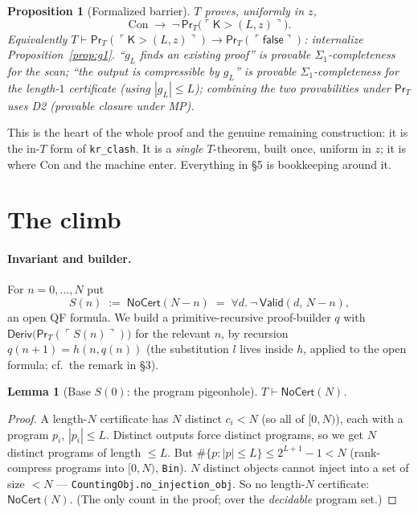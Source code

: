 \documentclass[11pt]{article}
\theoremstyle{plain}
\newtheorem{lemma}[theorem]{Lemma}
\newtheorem{proposition}[theorem]{Proposition}
\theoremstyle{definition}
\theoremstyle{remark}
\newcommand{\code}[1]{\ulcorner #1 \urcorner}
\newcommand{\Prov}{\mathsf{Pr}}
\newcommand{\Con}{\mathrm{Con}}
\newcommand{\Kgt}{\mathsf{K{>}}}
\newcommand{\Valid}{\mathsf{Valid}}
\newcommand{\NoCert}{\mathsf{NoCert}}
\newcommand{\false}{\mathsf{false}}
\begin{document}
\begin{proposition}[Formalized barrier]\label{prop:fbar}
$T$ proves, uniformly in $z$,
\[
  \Con \;\longrightarrow\; \neg\,\Prov_T\big(\code{\Kgt(L,z)}\big).
\]
Equivalently $T \vdash \Prov_T(\code{\Kgt(L,z)}) \to \Prov_T(\code{\false})$:
internalize Proposition~\ref{prop:g1}. ``$g_L$ finds an existing proof'' is provable
$\Sigma_1$-completeness for the scan; ``the output is compressible by $g_L$'' is
provable $\Sigma_1$-completeness for the length-$1$ certificate (using $|g_L|\le L$);
combining the two provabilities under $\Prov_T$ uses D2 (provable closure under MP).
\end{proposition}

\noindent This is the heart of the whole proof and the genuine remaining
construction: it is the in-$T$ form of \texttt{kr\_clash}. It is a \emph{single}
$T$-theorem, built once, uniform in $z$; it is where $\Con$ and the machine enter.
Everything in \S5 is bookkeeping around it.

\section{The climb}

\paragraph{Invariant and builder.} For $n=0,\dots,N$ put
\[
  S(n) \;:=\; \NoCert(N-n) \;=\; \forall d.\ \neg\,\Valid(d,\,N-n),
\]
an open QF formula. We build a primitive-recursive proof-builder $q$ with
$\mathsf{Deriv}\big(\Prov_T(\code{S(n)})\big)$ for the relevant $n$, by recursion
$q(n{+}1)=h(n,q(n))$ (the substitution $l$ lives inside $h$, applied to the open
formula; cf.\ the remark in \S3).

\begin{lemma}[Base $S(0)$: the program pigeonhole]\label{lem:base}
$T \vdash \NoCert(N)$.
\end{lemma}
\begin{proof}
A length-$N$ certificate has $N$ distinct $c_i<N$ (so all of $[0,N)$), each with a
program $p_i$, $|p_i|\le L$. Distinct outputs force distinct programs, so we get $N$
distinct programs of length $\le L$. But $\#\{p : |p|\le L\}\le 2^{L+1}-1 < N$
(rank-compress programs into $[0,N)$, \texttt{Bin}). $N$ distinct objects cannot inject
into a set of size $<N$ --- \texttt{CountingObj.no\_injection\_obj}. So no length-$N$
certificate: $\NoCert(N)$. (The only count in the proof; over the \emph{decidable}
program set.)
\end{proof}
\end{document}
